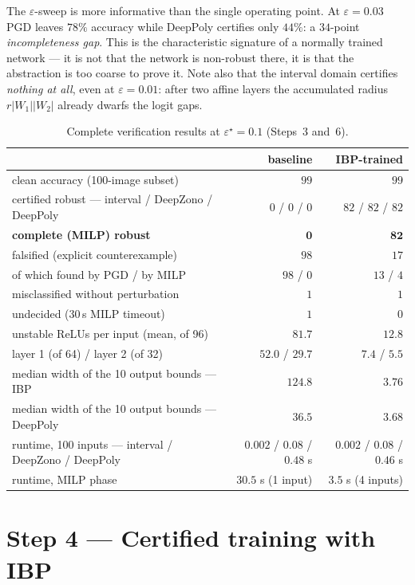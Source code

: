 \documentclass[11pt,a4paper]{article}
\newcommand{\eps}{\varepsilon}
\begin{document}
The $\eps$-sweep is more informative than the single operating point. At
$\eps=0.03$ PGD leaves $78\%$ accuracy while DeepPoly certifies only $44\%$: a
$34$-point \emph{incompleteness gap}. This is the characteristic signature of a
normally trained network --- it is not that the network is non-robust there, it
is that the abstraction is too coarse to prove it. Note also that the interval
domain certifies \emph{nothing at all}, even at $\eps=0.01$: after two affine
layers the accumulated radius $r|W_1||W_2|$ already dwarfs the logit gaps.

\begin{table}[H]
\centering\small
\begin{tabular}{lrr}
\toprule
& baseline & IBP-trained\\
\midrule
clean accuracy (100-image subset) & $99$ & $99$\\
certified robust --- interval / DeepZono / DeepPoly & $0$ / $0$ / $0$ & $82$ / $82$ / $82$\\
\textbf{complete (MILP) robust} & $\mathbf{0}$ & $\mathbf{82}$\\
falsified (explicit counterexample) & $98$ & $17$\\
\quad of which found by PGD / by MILP & $98$ / $0$ & $13$ / $4$\\
misclassified without perturbation & $1$ & $1$\\
undecided (30\,s MILP timeout) & $1$ & $0$\\
\midrule
unstable ReLUs per input (mean, of 96) & $81.7$ & $12.8$\\
\quad layer 1 (of 64) / layer 2 (of 32) & $52.0$ / $29.7$ & $7.4$ / $5.5$\\
median width of the 10 output bounds --- IBP & $124.8$ & $3.76$\\
median width of the 10 output bounds --- DeepPoly & $36.5$ & $3.68$\\
\midrule
runtime, 100 inputs --- interval / DeepZono / DeepPoly & $0.002$ / $0.08$ / $0.48$ s & $0.002$ / $0.08$ / $0.46$ s\\
runtime, MILP phase & $30.5$ s (1 input) & $3.5$ s (4 inputs)\\
\bottomrule
\end{tabular}
\caption{Complete verification results at $\eps^\star=0.1$ (Steps~3 and~6).}
\label{tab:complete}
\end{table}

\section{Step 4 --- Certified training with IBP}
\label{sec:ibp}
\end{document}
